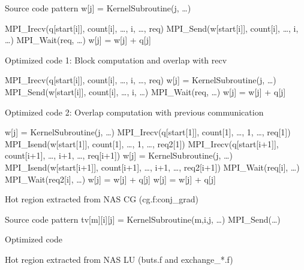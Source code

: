 \begin{algorithm}
{\scriptsize
\begin{algorithmic}
\Require Source code pattern
  \State w[j] = KernelSubroutine(j, \ldots)
\EndFor

  \State MPI\_Irecv(q[start[i]], count[i], \ldots, i, \ldots, req)
  \State MPI\_Send(w[start[i]], count[i], \ldots, i, \ldots)
  \State MPI\_Wait(req, \ldots)
    \State w[j] = w[j] + q[j]
  \EndFor
\EndFor

\Ensure Optimized code 1: Block computation and overlap with recv

  \State MPI\_Irecv(q[start[i]], count[i], \ldots, i, \ldots, req)
    \State w[j] = KernelSubroutine(j, \ldots)
  \EndFor
  \State MPI\_Send(w[start[i]], count[i], \ldots, i, \ldots)
  \State MPI\_Wait(req, \ldots)
    \State w[j] = w[j] + q[j]
  \EndFor
\EndFor

\Ensure Optimized code 2: Overlap computation with previous communication

  \State w[j] = KernelSubroutine(j, \ldots)
\EndFor
\State MPI\_Irecv(q[start[1]], count[1], \ldots, 1, \ldots, req[1])
\State MPI\_Isend(w[start[1]], count[1], \ldots, 1, \ldots, req2[1])
  \State MPI\_Irecv(q[start[i+1]], count[i+1], \ldots, i+1, \ldots, req[i+1])
    \State w[j] = KernelSubroutine(j, \ldots)
  \EndFor
  \State MPI\_Isend(w[start[i+1]], count[i+1], \ldots, i+1, \ldots, req2[i+1])
  \State MPI\_Wait(req[i], \ldots)
  \State MPI\_Wait(req2[i], \ldots)
    \State w[j] = w[j] + q[j]
  \EndFor
\EndFor
{}
  \State w[j] = w[j] + q[j]
\EndFor

\end{algorithmic}
\caption{Hot region extracted from NAS CG (cg.f:conj\_grad)}
\label{pat:cg}
}%
\end{algorithm}

\begin{algorithm}
{\scriptsize
\begin{algorithmic}
\Require Source code pattern
      \State tv[m][i][j] = KernelSubroutine(m,i,j, \ldots)
    \EndFor
  \EndFor
\EndFor
\State {}
  \State MPI\_Send(\ldots)
\EndIf

\Ensure Optimized code
\end{algorithmic}
\caption{Hot region extracted from NAS LU (buts.f and exchange\_*.f)}
\label{pat:mg}
}%
\end{algorithm}

